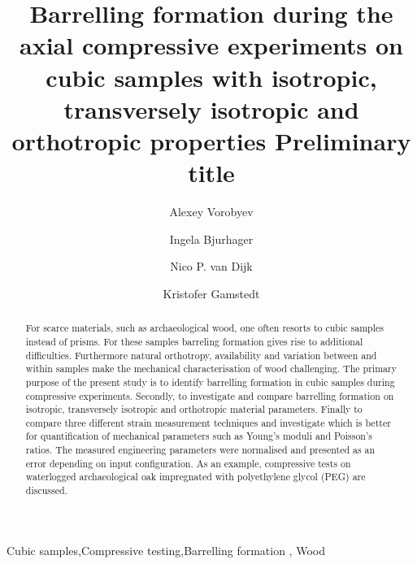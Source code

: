 \documentclass[review]{elsarticle}
\begin{document}
\begin{frontmatter}

\title{Barrelling formation during the axial compressive experiments on cubic
samples with  isotropic, transversely isotropic and orthotropic properties
{\color{red} Preliminary title}}







\author{Alexey Vorobyev}


\author{Ingela Bjurhager}
\author{Nico P. van Dijk}
\author{Kristofer Gamstedt}

\address{Uppsala University, Division of Appplied Mechanics,
Uppsala, Sweden }



\begin{abstract}
For scarce materials, such as archaeological wood, one often resorts to cubic
samples instead of prisms. For these samples barreling formation gives rise to additional difficulties.
Furthermore natural orthotropy, availability and variation between and within
samples make the mechanical characterisation of wood  challenging. 
The primary purpose of the present study is to identify barrelling
formation in cubic samples during compressive experiments. Secondly, to investigate and
compare barrelling formation on isotropic, transversely 
isotropic and orthotropic material parameters. Finally to compare three 
different strain measurement techniques and investigate which is better for quantification 
of mechanical parameters such as Young's moduli and Poisson's ratios.
The measured engineering parameters were normalised and presented as an error
depending on input configuration.
As an example, compressive tests on waterlogged archaeological oak impregnated
with polyethylene glycol (PEG) are discussed.

\end{abstract}

\begin{keyword}
Cubic samples\sep Compressive testing\sep Barrelling formation \sep
Wood
\end{keyword}

\end{frontmatter}
\end{document}
